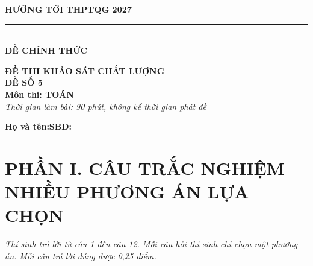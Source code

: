 \documentclass[12pt,a4paper]{article}
\begin{document}
\noindent
\begin{minipage}[t]{0.40\textwidth}
    \centering
    \textbf{HƯỚNG TỚI THPTQG 2027}\\[-2pt]
    \rule{3.2cm}{0.6pt}\\[4pt]
    \textbf{ĐỀ CHÍNH THỨC}
\end{minipage}\hfill
\begin{minipage}[t]{0.58\textwidth}
    \centering
    \textbf{ĐỀ THI KHẢO SÁT CHẤT LƯỢNG}\\
    \textbf{ĐỀ SỐ 5}\\
    \textbf{Môn thi: TOÁN}\\
    \textit{\small Thời gian làm bài: 90 phút, không kể thời gian phát đề}
\end{minipage}

\vspace{0.2cm}
\noindent
\begin{minipage}[b]{0.78\textwidth}
    \textbf{Họ và tên:}\dotfill\textbf{SBD:}\makebox[3.5cm]{\dotfill}
\end{minipage}\hfill
\begin{minipage}[b]{0.20\textwidth}
    \hfill
    \setlength{\fboxrule}{0.8pt}%
\end{minipage}
\vspace{0.2cm}

\section*{\large PHẦN I. CÂU TRẮC NGHIỆM NHIỀU PHƯƠNG ÁN LỰA CHỌN}
\textit{Thí sinh trả lời từ câu 1 đến câu 12. Mỗi câu hỏi thí sinh chỉ chọn một phương án. Mỗi câu trả lời đúng được 0,25 điểm.}
\end{document}
